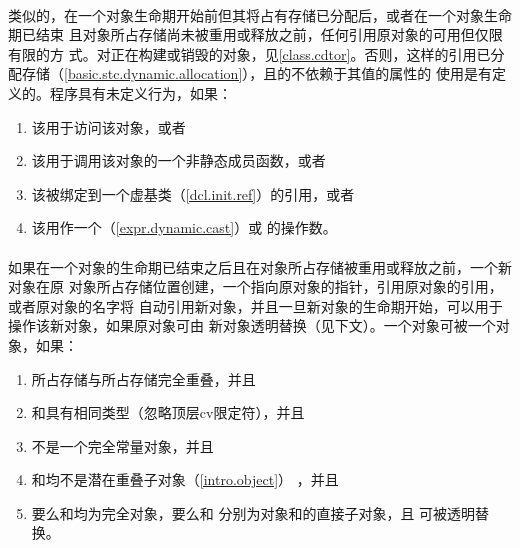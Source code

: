 \paragraph{} %
类似的，在一个对象生命期开始前但其将占有存储已分配后，或者在一个对象生命期已结束
且对象所占存储尚未被重用或释放之前，任何引用原对象的\glvalue{}可用但仅限有限的方
式。对正在构建或销毁的对象，见\ref{class.cdtor}。否则，这样的\glvalue{}引用已分
配存储（\ref{basic.stc.dynamic.allocation}），且\glvalue{}的不依赖于其值的属性的
使用是有定义的。程序具有未定义行为，如果：
\begin{enumerate}
  \item 该\glvalue{}用于访问该对象，或者
  \item 该\glvalue{}用于调用该对象的一个非静态成员函数，或者
  \item 该\glvalue{}被绑定到一个虚基类（\ref{dcl.init.ref}）的引用，或者
  \item 该\glvalue{}用作一个（\ref{expr.dynamic.cast}）或
        的操作数。
\end{enumerate}

\paragraph{} %
如果在一个对象的生命期已结束之后且在对象所占存储被重用或释放之前，一个新对象在原
对象所占存储位置创建，一个指向原对象的指针，引用原对象的引用，或者原对象的名字将
自动引用新对象，并且一旦新对象的生命期开始，可以用于操作该新对象，如果原对象可由
新对象透明替换（见下文）。一个对象可被一个对象，如果：
\begin{enumerate}
  \item {}所占存储与所占存储完全重叠，并且
  \item {}和具有相同类型（忽略顶层cv限定符），并且
  \item {}不是一个完全常量对象，并且
  \item {}和均不是潜在重叠子对象（\ref{intro.object}）
        ，并且
  \item 要么和均为完全对象，要么和
        分别为对象和的直接子对象，且
        可被透明替换。
\end{enumerate}

